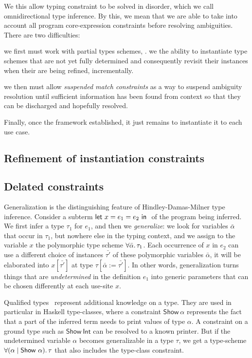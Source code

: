 \documentclass[acmsmall,screen,nonacm]{acmart}
\begin{document}
We this allow typing constraint to be solved in disorder, which we call
omnidirectional type inference. By this, we mean that we are able to take
into account all program core-expression constraints before resolving
ambiguities.  There are two difficulties:
\begin{enumerate*}
\item
  we first must work with partial types schemes, \ie. we the ability
  to instantiate type schemes that are not yet fully determined and
  consequently revisit their instances when their are being refined,
  incrementally.
\item
  we then must allow \emph{suspended match constraints} as a way to suspend ambiguity
  resolution until sufficient information has been found from context so
  that they can be discharged and hopefully resolved.

\end{enumerate*}
Finally, once the framework established, it just remains to instantiate it
to each use case.


\subsection {Refinement of instantiation constraints}

\subsection {Delated constraints} 


Generalization is the distinguishing feature of Hindley-Damas-Milner type
inference. Consider a subterm $\cletin{x = e_1}{e_2}$ of the program being
inferred. We first infer a type $\tau_1$ for $e_1$, and then we
\emph{generalize}: we look for variables $\bar{\alpha}$ that occur in
$\tau_1$, but nowhere else in the typing context, and we assign to the
variable $x$ the polymorphic type scheme $\forall {\bar{\alpha}}.\,{\tau_1}$. Each
occurrence of $x$ in $e_2$ can use a different choice of instances
$\bar{\tau'}$ of these polymorphic variables $\bar{\alpha}$, it will be
elaborated into $x [\bar{\tau'}]$ at type $\tau[\bar{\alpha} :=
\bar{\tau'}]$. In other words, generalization turns things that are
\emph{undetermined} in the definition $e_1$ into generic parameters that can
be chosen differently at each use-site $x$.

Qualified types~\citep*{TODO} represent additional knowledge on a type. They
are used in particular in Haskell type-classes, where a constraint
$\mathsf{Show}~\alpha$ represents the fact that a part of the inferred term
needs to print values of type $\alpha$. A constraint on a ground type such
as $\mathsf{Show}~\mathsf{Int}$ can be resolved to a known printer. But if
the undetermined variable $\alpha$ becomes generalizable in a type $\tau$,
we get a type-scheme $\forall {(\alpha \mid \mathsf{Show}~\alpha)}.\,{\tau}$ that
also includes the type-class constraint.
\end{document}
